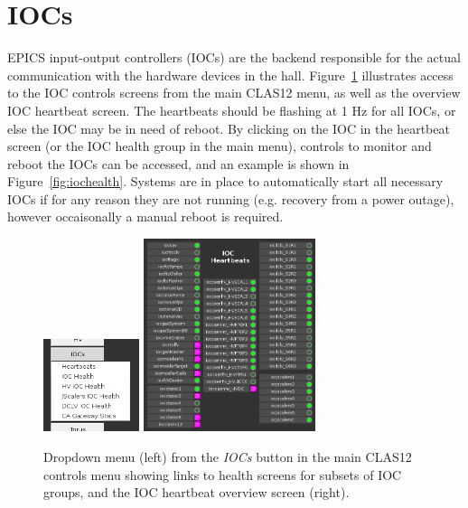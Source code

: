 \documentclass[amsmath,amssymb,notitlepage,11pt]{revtex4}
\begin{document}
\section{IOCs}
EPICS input-output controllers (IOCs) are the backend responsible for the actual communication with the hardware devices in the hall.  Figure~\ref{fig:iocmenu} illustrates access to the IOC controls screens from the main CLAS12 menu, as well as the overview IOC heartbeat screen.  The heartbeats should be flashing at 1 Hz for all IOCs, or else the IOC may be in need of reboot.  By clicking on the IOC in the heartbeat screen (or the IOC health group in the main menu), controls to monitor and reboot the IOCs can be accessed, and an example is shown in Figure~\ref{fig:iochealth}.  Systems are in place to automatically start all necessary IOCs if for any reason they are not running (e.g. recovery from a power outage), however occaisonally a manual reboot is required.

\begin{figure}[htbp]\centering
  \includegraphics[width=0.25\textwidth]{pics/iocmenu}
  \includegraphics[width=0.45\textwidth]{pics/iocbeats}
  \caption{Dropdown menu (left) from the {\em IOCs} button in the main CLAS12 controls menu showing links to health screens for subsets of IOC groups, and the IOC heartbeat overview screen (right).\label{fig:iocmenu}}
\end{figure}
\end{document}
